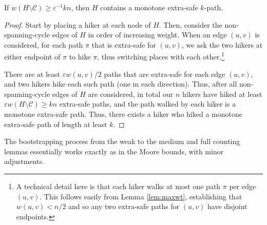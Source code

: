 \documentclass{article}\usepackage[a4paper,margin=20mm]{geometry}
\newcommand{\eps}{\varepsilon}
\newcommand{\cee}{\mathcal{C}}
\begin{document}
\begin{lemma}  \label{lem:warmupwc}
If $w(H \setminus \cee) \ge \eps^{-1} kn$, then $H$ contains a monotone extra-safe $k$-path.
\end{lemma}
\begin{proof}
Start by placing a hiker at each node of $H$.
Then, consider the non-spanning-cycle edges of $H$ in order of increasing weight.
When an edge $(u, v)$ is considered, for each path $\pi$ that is extra-safe for $(u, v)$, we ask the two hikers at either endpoint of $\pi$ to hike $\pi$, thus switching places with each other.\footnote{A technical detail here is that each hiker walks at most one path $\pi$ per edge $(u, v)$.  This follows easily from Lemma \ref{lem:maxwt}, establishing that $w(u, v) < n/2$ and so any two extra-safe paths for $(u, v)$ have disjoint endpoints.}


There are at least $\eps w(u, v)/2$ paths that are extra-safe for each edge $(u, v)$, and two hikers hike each such path (one in each direction).
Thus, after all non-spanning-cycle edges of $H$ are considered, in total our $n$ hikers have hiked at least $\eps w(H \setminus \cee) \ge kn$ extra-safe paths, and the path walked by each hiker is a monotone extra-safe path.
Thus, there exists a hiker who hiked a monotone extra-safe path of length at least $k$.
\end{proof}

The bootstrapping process from the weak to the medium and full counting lemmas essentially works exactly as in the Moore bounds, with minor adjustments.
\end{document}
